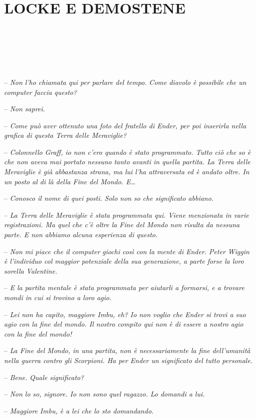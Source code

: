 \chapter{LOCKE E DEMOSTENE}

{~}

{~}

{~}

{-- \emph{Non l'ho chiamata qui per parlare del tempo. Come diavolo è
		possibile che un computer faccia questo?}}

{-- \emph{Non saprei.}}

{-- \emph{Come può aver ottenuto una foto del fratello di Ender, per poi
		inserirla nella grafica di questa Terra delle Meraviglie?}}

{-- \emph{Colonnello Graff, io non c'ero quando è stato programmato.
		Tutto ciò che so è che non aveva mai portato nessuno tanto avanti in
		quella partita. La Terra delle Meraviglie è già abbastanza strana, ma
		lui l'ha attraversata ed è andato oltre. In un posto al di là della Fine
		del Mondo. E\ldots{}}}

{-- \emph{Conosco il nome di quei posti. Solo non so che significato
		abbiano.}}

{-- \emph{La Terra delle Meraviglie è stata programmata qui. Viene
		menzionata in varie registrazioni. Ma quel che c'è oltre la Fine del
		Mondo non risulta da nessuna parte. E non abbiamo alcuna esperienza di
		questo.}}

{-- \emph{Non mi piace che il computer giochi così con la mente di
		Ender. Peter Wiggin è l'individuo col maggior potenziale della sua
		generazione, a parte forse la loro sorella Valentine.}}

{-- \emph{E la partita mentale è stata programmata per aiutarli a
		formarsi, e a trovare mondi in cui si trovino a loro agio.}}

{-- \emph{Lei non ha capito, maggiore Imbu, eh? Io non voglio che Ender
		si trovi a suo agio con la fine del mondo. Il nostro compito qui non è
		di essere a nostro agio con la fine del mondo!}}

{-- \emph{La Fine del Mondo, in una partita, non è necessariamente la
		fine dell'umanità nella guerra contro gli Scorpioni. Ha per Ender un
		significato del tutto personale.}}

{-- \emph{Bene. Quale significato?}}

{-- \emph{Non lo so, signore. Io non sono quel ragazzo. Lo domandi a
		lui.}}

{-- \emph{Maggiore Imbu, è a lei che lo sto domandando.}}


